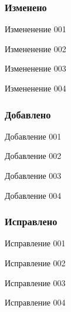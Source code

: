 \hypertarget{page1_ssubV101Changes}{}\subsubsection{Изменено}\label{page1_ssubV101Changes}
\begin{DoxyItemize}
\item Измененение 001 \item Измененение 002 \item Измененение 003 \item Измененение 004 \end{DoxyItemize}
\hypertarget{page1_ssubV101Add}{}\subsubsection{Добавлено}\label{page1_ssubV101Add}
\begin{DoxyItemize}
\item Добавление 001 \item Добавление 002 \item Добавление 003 \item Добавление 004 \end{DoxyItemize}
\hypertarget{page1_ssubV101Fixed}{}\subsubsection{Исправлено}\label{page1_ssubV101Fixed}
\begin{DoxyItemize}
\item Исправление 001 \item Исправление 002 \item Исправление 003 \item Исправление 004 \end{DoxyItemize}
